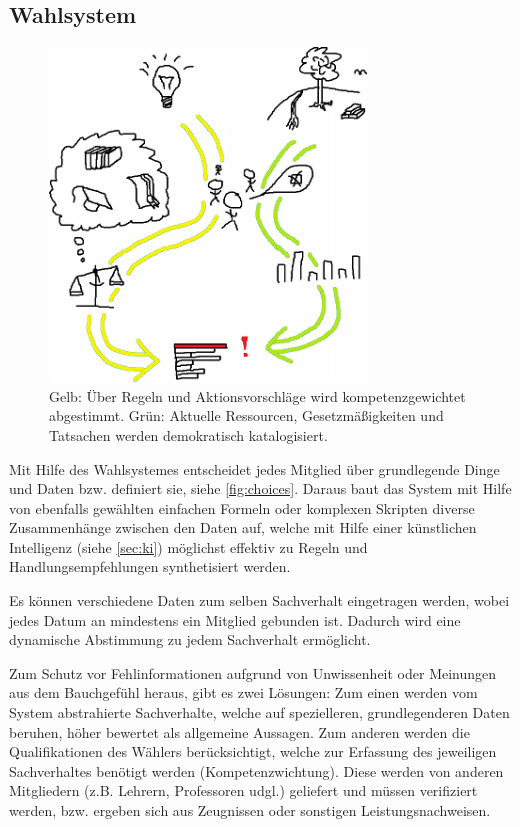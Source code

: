 \subsection{Wahlsystem}\label{sec:maintenance/voting}

\begin{figure}
\caption[Wahlsystem (Übersicht)]{Gelb: Über Regeln und Aktionsvorschläge wird kompetenzgewichtet abgestimmt. Grün: Aktuelle Ressourcen, Gesetzmäßigkeiten und Tatsachen werden demokratisch katalogisiert.}
\label{fig:choices}
\begin{center}
\includegraphics[width=0.75\textwidth]{../gfx/speciosgraph2_small.png}
\end{center}
\end{figure}

Mit Hilfe des Wahlsystemes entscheidet jedes Mitglied über grundlegende Dinge und Daten bzw. definiert sie, siehe \vref{fig:choices}. Daraus baut das System mit Hilfe von ebenfalls gewählten einfachen Formeln oder komplexen Skripten diverse Zusammenhänge zwischen den Daten auf, welche mit Hilfe einer künstlichen Intelligenz (siehe \vref{sec:ki}) möglichst effektiv zu Regeln und Handlungsempfehlungen synthetisiert werden.

Es können verschiedene Daten zum selben Sachverhalt eingetragen werden, wobei jedes Datum an mindestens ein Mitglied gebunden ist. Dadurch wird eine dynamische Abstimmung zu jedem Sachverhalt ermöglicht.

Zum Schutz vor Fehlinformationen aufgrund von Unwissenheit oder Meinungen aus dem Bauchgefühl heraus, gibt es zwei Lösungen: Zum einen werden vom System abstrahierte Sachverhalte, welche auf spezielleren, grundlegenderen Daten beruhen, höher bewertet als allgemeine Aussagen. Zum anderen werden die Qualifikationen des Wählers berücksichtigt, welche zur Erfassung des jeweiligen Sachverhaltes benötigt werden (Kompetenzwichtung). Diese werden von anderen Mitgliedern (z.B. Lehrern, Professoren udgl.) geliefert und müssen verifiziert werden, bzw. ergeben sich aus Zeugnissen oder sonstigen Leistungsnachweisen.

